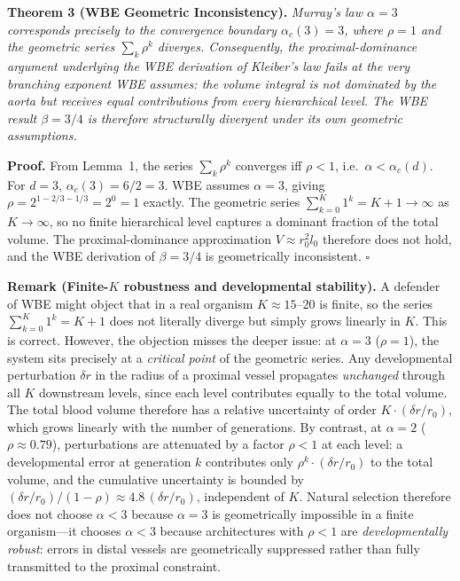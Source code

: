\documentclass[11pt,a4paper]{article}
\theoremstyle{remark}
\newcounter{manualthm}
\begin{document}
\vspace{0.4em}
\noindent\textbf{Theorem 3 (WBE Geometric Inconsistency).}\label{thm:wbe}
\textit{Murray's law $\alpha = 3$ corresponds precisely to the convergence boundary $\alpha_c(3) = 3$, where $\rho = 1$ and the geometric series $\sum_k \rho^k$ diverges. Consequently, the proximal-dominance argument underlying the WBE derivation of Kleiber's law fails at the very branching exponent WBE assumes: the volume integral is not dominated by the aorta but receives equal contributions from every hierarchical level. The WBE result $\beta = 3/4$ is therefore structurally divergent under its own geometric assumptions.}

\noindent\textbf{Proof.} From Lemma~1, the series $\sum_k \rho^k$ converges iff $\rho < 1$, i.e.\ $\alpha < \alpha_c(d)$. For $d=3$, $\alpha_c(3) = 6/2 = 3$. WBE assumes $\alpha = 3$, giving $\rho = 2^{1-2/3-1/3} = 2^0 = 1$ exactly. The geometric series $\sum_{k=0}^{K} 1^k = K+1 \to \infty$ as $K \to \infty$, so no finite hierarchical level captures a dominant fraction of the total volume. The proximal-dominance approximation $V \approx r_0^2 l_0$ therefore does not hold, and the WBE derivation of $\beta = 3/4$ is geometrically inconsistent. $\square$

\noindent\textbf{Remark (Finite-$K$ robustness and developmental stability).} A defender of WBE might object that in a real organism $K \approx 15$--$20$ is finite, so the series $\sum_{k=0}^{K} 1^k = K+1$ does not literally diverge but simply grows linearly in $K$. This is correct. However, the objection misses the deeper issue: at $\alpha = 3$ ($\rho = 1$), the system sits precisely at a \emph{critical point} of the geometric series. Any developmental perturbation $\delta r$ in the radius of a proximal vessel propagates \emph{unchanged} through all $K$ downstream levels, since each level contributes equally to the total volume. The total blood volume therefore has a relative uncertainty of order $K \cdot (\delta r / r_0)$, which grows linearly with the number of generations. By contrast, at $\alpha = 2$ ($\rho \approx 0.79$), perturbations are attenuated by a factor $\rho < 1$ at each level: a developmental error at generation $k$ contributes only $\rho^k \cdot (\delta r / r_0)$ to the total volume, and the cumulative uncertainty is bounded by $(\delta r / r_0) / (1-\rho) \approx 4.8\,(\delta r / r_0)$, independent of $K$. Natural selection therefore does not choose $\alpha < 3$ because $\alpha = 3$ is geometrically impossible in a finite organism---it chooses $\alpha < 3$ because architectures with $\rho < 1$ are \emph{developmentally robust}: errors in distal vessels are geometrically suppressed rather than fully transmitted to the proximal constraint.
\end{document}
